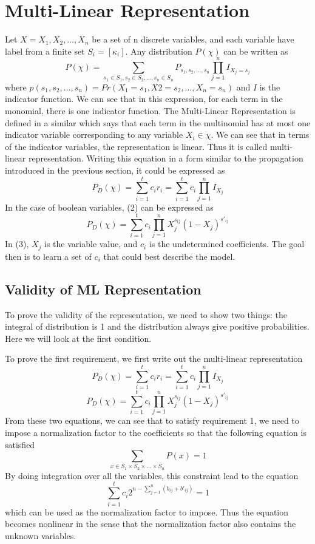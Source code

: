 \documentclass[11pt]{article}
\begin{document}
\section{Multi-Linear Representation}
Let $X={X_1,X_2,\ldots,X_n}$ be a set of n discrete variables, and each variable have label from a finite set $S_i=[\kappa_i]$. Any distribution $P(\chi)$ can be written as 
\[P(\chi)=\sum\limits_{s_1\in S_1,s_2\in S_2,\ldots,s_n\in S_n}P_{s_1,s_2,\ldots,s_n}\prod\limits_{j=1}^{n}I_{X_j=s_j}\]
where $p(s_1,s_2,\ldots,s_n)=Pr(X_1=s_1,X2=s_2,\ldots,X_n=s_n)$ and $I$ is the indicator function. We can see that in this expression, for each term in the monomial, there is one indicator function. The Multi-Linear Representation is defined in a similar which says that each term in the multinomial has at most one indicator variable corresponding to any variable $X_i \in \chi$. We can see that in terms of the indicator variables, the representation is linear. Thus it is called multi-linear representation. 
Writing this equation in a form similar to the propagation introduced in the previous section, it could be expressed as 
\begin{equation}
P_D(\chi)=\sum\limits_{i=1}^{t}c_ir_i=\sum\limits_{i=1}^{t}c_i\prod\limits_{j=1}^{n}I_{X_j}
\end{equation}
In the case of boolean variables, (2) can be expressed as 
\begin{equation}
P_D(\chi)=\sum\limits_{i=1}^{t}c_i\prod\limits_{j=1}^{n}X_j^{s_{ij}}{(1-X_j)}^{s'_{ij}}
\end{equation}
In (3), $X_j$ is the variable value, and $c_i$ is the undetermined coefficients. The goal then is to learn a set of $c_i$ that could best describe the model.

\subsection{Validity of ML Representation}
To prove the validity of the representation, we need to show two things: the integral of distribution is 1 and the distribution always give positive probabilities. Here we will look at the first condition. 

\noindent To prove the first requirement, we first write out the multi-linear representation
\[P_D(\chi)=\sum\limits_{i=1}^{t}c_ir_i=\sum\limits_{i=1}^{t}c_i\prod\limits_{j=1}^{n}I_{X_j}\]
\[P_D(\chi)=\sum\limits_{i=1}^{t}c_i\prod\limits_{j=1}^{n}X_j^{s_{ij}}{(1-X_j)}^{s'_{ij}}\]
From these two equations, we can see that to satisfy requirement 1, we need to impose a normalization factor to the coefficients so that the following equation is satisfied
\[\sum\limits_{x\in S_1\times S_2\times \ldots \times S_n}P(x)=1\]
By doing integration over all the variables, this constraint lead to the equation 
\[\sum\limits_{i=1}^{t}c_i2^{n-\sum_{j=1}^{n}(b_{ij}+b'_{ij})}=1\]
which can be used as the normalization factor to impose. Thus the equation becomes nonlinear in the sense that the normalization factor also contains the unknown variables.
\end{document}
